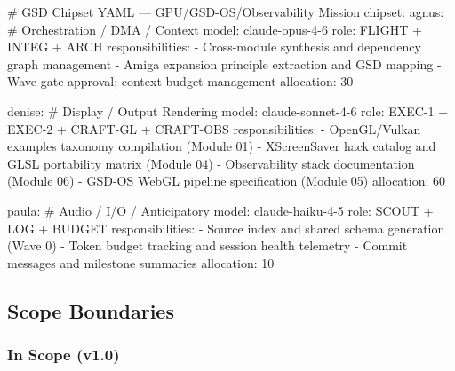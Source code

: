 \documentclass[11pt,letterpaper]{article}
\begin{document}
\begin{asciibox}
# GSD Chipset YAML — GPU/GSD-OS/Observability Mission
chipset:
  agnus:                          # Orchestration / DMA / Context
    model: claude-opus-4-6
    role: FLIGHT + INTEG + ARCH
    responsibilities:
      - Cross-module synthesis and dependency graph management
      - Amiga expansion principle extraction and GSD mapping
      - Wave gate approval; context budget management
    allocation: 30%

  denise:                         # Display / Output Rendering
    model: claude-sonnet-4-6
    role: EXEC-1 + EXEC-2 + CRAFT-GL + CRAFT-OBS
    responsibilities:
      - OpenGL/Vulkan examples taxonomy compilation (Module 01)
      - XScreenSaver hack catalog and GLSL portability matrix (Module 04)
      - Observability stack documentation (Module 06)
      - GSD-OS WebGL pipeline specification (Module 05)
    allocation: 60%

  paula:                          # Audio / I/O / Anticipatory
    model: claude-haiku-4-5
    role: SCOUT + LOG + BUDGET
    responsibilities:
      - Source index and shared schema generation (Wave 0)
      - Token budget tracking and session health telemetry
      - Commit messages and milestone summaries
    allocation: 10%

\end{asciibox}

\subsection{Scope Boundaries}

\subsubsection{In Scope (v1.0)}
\end{document}

